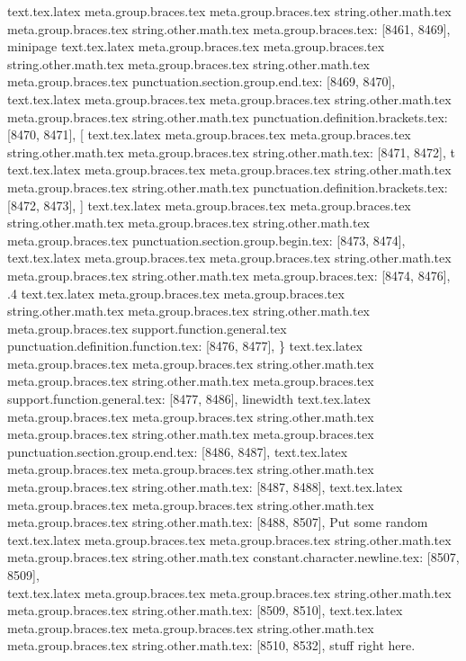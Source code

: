 {{{{{{{{{{{{{{{{{{{{{{{{{{{{{{{{{{{{{{{{{{{{{{{{{{{{{{{{{{{{{{{{{{{{{{{{{{{{{{{{{{{{{{{{{{{{{{{{{{{{{{{{{{{{{{{{{{{{{{{{{{{{{{{{{{{{{{{{{{{{{{{{{{{{{{{{{{{{{{{{{{{{{{{{{{{{{{{{{{{{{{{{{{{{{{{{{{{{{{{{{{{{{{{{{{{{{{{{{{{{{{{{{{{{{{{{{{{{{{{{{{{{{{{{{{{text.tex.latex meta.group.braces.tex meta.group.braces.tex string.other.math.tex meta.group.braces.tex string.other.math.tex meta.group.braces.tex: [8461, 8469], {minipage}
text.tex.latex meta.group.braces.tex meta.group.braces.tex string.other.math.tex meta.group.braces.tex string.other.math.tex meta.group.braces.tex punctuation.section.group.end.tex: [8469, 8470], {}}
text.tex.latex meta.group.braces.tex meta.group.braces.tex string.other.math.tex meta.group.braces.tex string.other.math.tex punctuation.definition.brackets.tex: [8470, 8471], {[}
text.tex.latex meta.group.braces.tex meta.group.braces.tex string.other.math.tex meta.group.braces.tex string.other.math.tex: [8471, 8472], {t}
text.tex.latex meta.group.braces.tex meta.group.braces.tex string.other.math.tex meta.group.braces.tex string.other.math.tex punctuation.definition.brackets.tex: [8472, 8473], {]}
text.tex.latex meta.group.braces.tex meta.group.braces.tex string.other.math.tex meta.group.braces.tex string.other.math.tex meta.group.braces.tex punctuation.section.group.begin.tex: [8473, 8474], {{}
text.tex.latex meta.group.braces.tex meta.group.braces.tex string.other.math.tex meta.group.braces.tex string.other.math.tex meta.group.braces.tex: [8474, 8476], {.4}
text.tex.latex meta.group.braces.tex meta.group.braces.tex string.other.math.tex meta.group.braces.tex string.other.math.tex meta.group.braces.tex support.function.general.tex punctuation.definition.function.tex: [8476, 8477], {\}
text.tex.latex meta.group.braces.tex meta.group.braces.tex string.other.math.tex meta.group.braces.tex string.other.math.tex meta.group.braces.tex support.function.general.tex: [8477, 8486], {linewidth}
text.tex.latex meta.group.braces.tex meta.group.braces.tex string.other.math.tex meta.group.braces.tex string.other.math.tex meta.group.braces.tex punctuation.section.group.end.tex: [8486, 8487], {}}
text.tex.latex meta.group.braces.tex meta.group.braces.tex string.other.math.tex meta.group.braces.tex string.other.math.tex: [8487, 8488], {
}
text.tex.latex meta.group.braces.tex meta.group.braces.tex string.other.math.tex meta.group.braces.tex string.other.math.tex: [8488, 8507], {    Put some random}
text.tex.latex meta.group.braces.tex meta.group.braces.tex string.other.math.tex meta.group.braces.tex string.other.math.tex constant.character.newline.tex: [8507, 8509], {\\}
text.tex.latex meta.group.braces.tex meta.group.braces.tex string.other.math.tex meta.group.braces.tex string.other.math.tex: [8509, 8510], {
}
text.tex.latex meta.group.braces.tex meta.group.braces.tex string.other.math.tex meta.group.braces.tex string.other.math.tex: [8510, 8532], {    stuff right here.
}}}}}}}}}}}}}}}}}}}}}}}}}}}}}}}}}}}}}}}}}}}}}}}}}}}}}}}}}}}}}}}}}}}}}}}}}}}}}}}}}}}}}}}}}}}}}}}}}}}}}}}}}}}}}}}}}}}}}}}}}}}}}}}}}}}}}}}}}}}}}}}}}}}}}}}}}}}}}}}}}}}}}}}}}}}}}}}}}}}}}}}}}}}}}}}}}}}}}}}}}}}}}}}}}}}}}}}}}}}}}}}}}}}}}}}}}}}}}}}}}}}}}}}}}}}}

